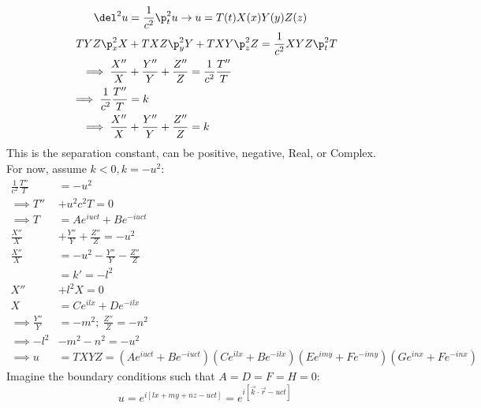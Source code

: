\documentclass[Maths.tex]{subfiles}
\begin{document}
\begin{example}
\begin{align}
	\del^2u &= \frac{1}{c^2}\p_t^2u \to u = T(t)X(x)Y(y)Z(z) \\
	TYZ\p_x^2X &+ TXZ\p_y^2Y + TXY\p_z^2Z = \frac{1}{c^2}XYZ\p_t^2T \\
	\implies \frac{X''}{X} &+ \frac{Y''}{Y} + \frac{Z''}{Z} = \frac{1}{c^2}\frac{T''}{T} \\
	\implies \frac{1}{c^2}\frac{T''}{T} &= k \\
	\implies \frac{X''}{X} &+ \frac{Y''}{Y} + \frac{Z''}{Z} = k
\end{align}
This is the separation constant, can be positive, negative, Real, or Complex. \\
For now, assume $k < 0, k = -u^2$:
\begin{align}
	\frac{1}{c^2}\frac{T''}{T} &= -u^2 \\
	\implies T'' &+ u^2c^2T = 0 \\
	\implies T &= Ae^{iuct} + Be^{-iuct} \\
	\frac{X''}{X} &+ \frac{Y''}{Y} + \frac{Z''}{Z} = -u^2 \\
	\frac{X''}{X} &= -u^2 - \frac{Y''}{Y} - \frac{Z''}{Z} \\
				  &= k' = -l^2 \\
	X'' &+ l^2X = 0 \\
	X &= Ce^{ilx} + De^{-ilx} \\
	\implies \frac{Y''}{Y} &= -m^2;~ \frac{Z''}{Z} = -n^2 \\
	\implies -l^2 &- m^2 - n^2 = -u^2 \\
	\implies u &= TXYZ = \left(Ae^{iuct} + Be^{-iuct}\right)\left(Ce^{ilx} + Be^{-ilx}\right)\left(Ee^{imy} + Fe^{-imy}\right) \left(Ge^{inx} + Fe^{-inx}\right)
\end{align}
Imagine the boundary conditions such that $A = D = F = H = 0$:
\begin{equation}
	u = e^{i[lx + my + nz - uct]} = e^{i[\vec{k}\cdot\vec{r} - uct]}
\end{equation}
\end{example}
\end{document}
